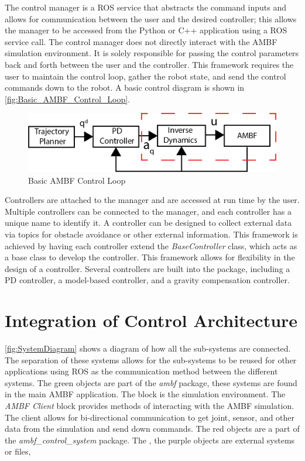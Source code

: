 The control manager is a ROS service that abstracts the command inputs and allows for communication between the user and the desired controller; this allows the manager to be accessed from the Python or C++ application using a ROS service call. The control manager does not directly interact with the AMBF simulation environment. It is solely responsible for passing the control parameters back and forth between the user and the controller. This framework requires the user to maintain the control loop, gather the robot state, and send the control commands down to the robot. A basic control diagram is shown in \autoref{fig:Basic_AMBF_Control_Loop}.


\begin{figure}[h!]
    \centering
    \includegraphics[scale=1.25]{images/sim/control_loop_basic.png}
    \caption[Basic AMBF Control Loop]{Basic AMBF Control Loop}
    \label{fig:Basic_AMBF_Control_Loop}
\end{figure}

Controllers are attached to the manager and are accessed at run time by the user. Multiple controllers can be connected to the manager, and each controller has a unique name to identify it. A controller can be designed to collect external data via topics for obstacle avoidance or other external information. This framework is achieved by having each controller extend the \textit{BaseController} class, which acts as a base class to develop the controller. This framework allows for flexibility in the design of a controller. Several controllers are built into the package, including a PD controller, a model-based controller, and a gravity compensation controller.  



\section{Integration of Control Architecture}

\autoref{fig:SystemDiagram} shows a diagram of how all the sub-systems are connected. The separation of these systems allows for the sub-systems to be reused for other applications using ROS as the communication method between the different systems. The green objects are part of the \textit{ambf} package, these systems are found in the main AMBF application. The  block is the simulation environment. The \textit{AMBF Client} block provides methods of interacting with the AMBF simulation. The client allows for bi-directional communication to get joint, sensor, and other data from the simulation and send down commands. The red objects are a part of the \textit{ambf\_control\_system} package. The 
, the purple objects are external systems or files, 


